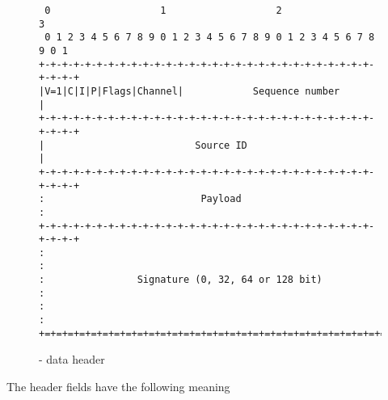 \documentclass{rfc}
\begin{document}
\begin{figure}
\begin{center}
\begin{verbatim}
 0                   1                   2                   3
 0 1 2 3 4 5 6 7 8 9 0 1 2 3 4 5 6 7 8 9 0 1 2 3 4 5 6 7 8 9 0 1
+-+-+-+-+-+-+-+-+-+-+-+-+-+-+-+-+-+-+-+-+-+-+-+-+-+-+-+-+-+-+-+-+
|V=1|C|I|P|Flags|Channel|            Sequence number            |
+-+-+-+-+-+-+-+-+-+-+-+-+-+-+-+-+-+-+-+-+-+-+-+-+-+-+-+-+-+-+-+-+
|                          Source ID                            |
+-+-+-+-+-+-+-+-+-+-+-+-+-+-+-+-+-+-+-+-+-+-+-+-+-+-+-+-+-+-+-+-+
:                           Payload                             :
+-+-+-+-+-+-+-+-+-+-+-+-+-+-+-+-+-+-+-+-+-+-+-+-+-+-+-+-+-+-+-+-+
:                                                               :
:                Signature (0, 32, 64 or 128 bit)               :
:                                                               :
+=+=+=+=+=+=+=+=+=+=+=+=+=+=+=+=+=+=+=+=+=+=+=+=+=+=+=+=+=+=+=+=+
\end{verbatim}
\end{center}
\caption{\ppetp- data header \label{fig:data-header}}
\end{figure}


The header fields have the following meaning
\end{document}
